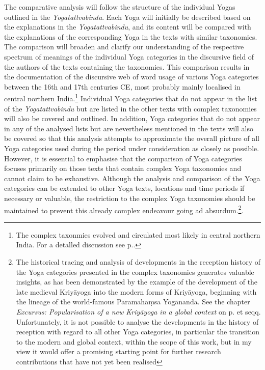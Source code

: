 The comparative analysis will follow the structure of the individual Yogas outlined in the \textit{Yogatattvabindu}. Each Yoga will initially be described based on the explanations in the \textit{Yogatattvabindu}, and its content will be compared with the explanations of the corresponding Yoga in the texts with similar taxonomies. The comparison will broaden and clarify our understanding of the respective spectrum of meanings of the individual Yoga categories in the discursive field of the authors of the texts containing the taxonomies. This comparison results in the documentation of the discursive web of word usage of various Yoga categories between the 16th and 17th centuries CE, most probably mainly localised in central northern India.\footnote{The complex taxonmies evolved and circulated most likely in central northern India. For a detalled discussion see p.\pageref{location}.} Individual Yoga categories that do not appear in the list of the \textit{Yogatattvabindu} but are listed in the other texts with complex taxonomies will also be covered and outlined. In addition, Yoga categories that do not appear in any of the analysed lists but are nevertheless mentioned in the texts will also be covered so that this analysis attempts to approximate the overall picture of all Yoga categories used during the period under consideration as closely as possible. However, it is essential to emphasise that the comparison of Yoga categories focuses primarily on those texts that contain complex Yoga taxonomies and cannot claim to be exhaustive. Although the analysis and comparison of the Yoga categories can be extended to other Yoga texts, locations and time periods if necessary or valuable, the restriction to the complex Yoga taxonomies should be maintained to prevent this already complex endeavour going ad absurdum.\footnote{The historical tracing and analysis of developments in the reception history of the Yoga categories presented in the complex taxonomies generates valuable insights, as has been demonstrated by the example of the development of the late medieval Kriyāyoga into the modern forms of Kriyāyoga, beginning with the lineage of the world-famous Paramahaṃsa Yogānanda. See the chapter \textit{Excursus: Popularisation of a new Kriyāyoga in a global context} on p.\pageref{excursuss} et seqq. Unfortunately, it is not possible to analyse the developments in the history of reception with regard to all other Yoga categories, in particular the transition to the modern and global context, within the scope of this work, but in my view it would offer a promising starting point for further research contributions that have not yet been realised}.      

